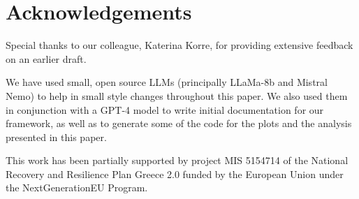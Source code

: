 %
\section*{Acknowledgements}

Special thanks to our colleague, Katerina Korre, for providing extensive feedback on an earlier draft.

We have used small, open source LLMs (principally LLaMa-8b and Mistral Nemo) to help in small style changes throughout this paper. We also used them in conjunction with a GPT-4 model \cite{openai2024gpt4technicalreport} to write initial documentation for our framework, as well as to generate some of the code for the plots and the analysis presented in this paper. 

This work has been partially supported by project MIS 5154714 of the National Recovery and Resilience Plan Greece 2.0 funded by the European Union under the NextGenerationEU Program.